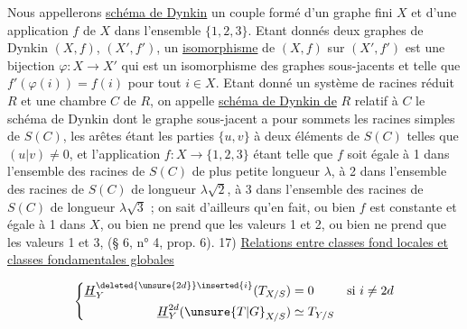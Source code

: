 Nous appellerons \uline{schéma de Dynkin} un couple formé d'un graphe fini $X$ et d'une application $f$ de $X$ dans l'ensemble $\{1,2,3\}$. Etant donnés deux graphes de Dynkin $(X,f)$, $(X',f')$, un \uline{isomorphisme} de $(X,f)$ sur $(X',f')$ est une bijection $\varphi:X\longrightarrow X'$ qui est un isomorphisme des graphes sous-jacents et telle que $f'(\varphi(i))=f(i)$ pour tout $i\in X$. Etant donné un système de racines réduit $R$ et une chambre $C$ de $R$, on appelle \uline{schéma de Dynkin de} $R$ relatif à $C$ le schéma de Dynkin dont le graphe sous-jacent a pour sommets les racines simples de $S(C)$, les arêtes étant les parties $\{u,v\}$ à deux éléments de $S(C)$ telles que $(u|v)\ne0$, et l'application $f:X\longrightarrow\{1,2,3\}$ étant telle que $f$ soit égale à 1 dans l'ensemble des racines de $S(C)$ de plus petite longueur $\lambda$, à 2 dans l'ensemble des racines de $S(C)$ de longueur $\lambda\sqrt2$, à 3 dans l'ensemble des racines de $S(C)$ de longueur $\lambda\sqrt3$ ; on sait d'ailleurs qu'en fait, ou bien $f$ est constante et égale à 1 dans $X$, ou bien ne prend que les valeurs 1 et 2, ou bien ne prend que les valeurs 1 et 3, (§ 6, n° 4, prop. 6).
17) \uline{Relations entre classes fond locales et classes fondamentales globales}



\[
\left\{\begin{aligned}
\underline H^{\deleted{\unsure{2d}}\inserted{i}}_Y(T_{X/S})&=0&&\text{si }i\ne2d\\
\underline H^{2d}_Y(\unsure{T|G}_{X/S})&\simeq T_{Y/S}
\end{aligned}\right.
\]

